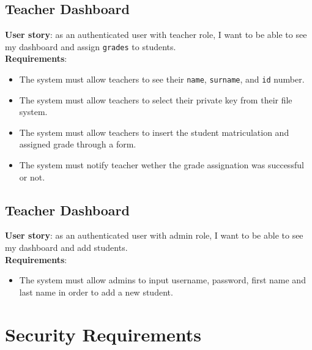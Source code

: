 \subsection{Teacher Dashboard}

\noindent\textbf{User story}: as an authenticated user with teacher role, I want to be able to see my dashboard and assign \texttt{grades} to students.\\
\noindent\textbf{Requirements}:
\begin{itemize}
    \item The system must allow teachers to see their \texttt{name}, \texttt{surname}, and \texttt{id} number.
    \item The system must allow teachers to select their private key from their file system.
    \item The system must allow teachers to insert the student matriculation and assigned grade through a form.
    \item The system must notify teacher wether the grade assignation was successful or not. 
\end{itemize}

\subsection{Teacher Dashboard}

\noindent\textbf{User story}: as an authenticated user with admin role, I want to be able to see my dashboard and add students.\\
\noindent\textbf{Requirements}:
\begin{itemize}
    \item The system must allow admins to input username, password, first name and last name in order to add a new student.
\end{itemize}

\section{Security Requirements}

